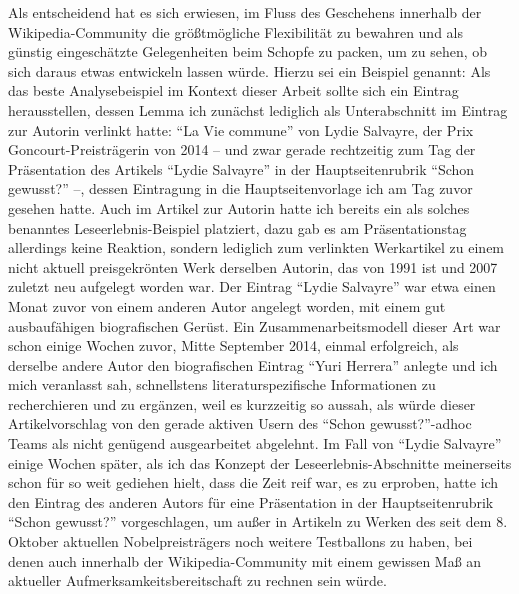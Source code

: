 \documentclass[fontsize=12pt]{scrartcl}
\begin{document}
Als entscheidend hat es sich erwiesen, im Fluss des Geschehens innerhalb der Wikipedia-Community die gr\"o{\ss}tm\"ogliche Flexibilit\"at zu bewahren und als g\"unstig einge\-sch\"atzte Gelegenheiten beim Schopfe zu packen, um zu sehen, ob sich daraus etwas entwickeln lassen w\"urde. Hierzu sei ein Beispiel genannt: Als das beste Ana\-lysebeispiel im Kontext dieser Arbeit sollte sich ein Eintrag he\-rausstellen, dessen Lemma ich zun\"achst lediglich als Unterabschnitt im Eintrag zur Autorin\textsuperscript{\tiny *} verlinkt hatte: "`La Vie commune"' von Lydie Salvayre, der Prix Goncourt-Preistr\"agerin\textsuperscript{\tiny *} von 2014 -- und zwar gerade rechtzeitig zum Tag der Pr\"asentation des Artikels "`Lydie Salvayre"' in der Hauptseitenrubrik "`Schon gewusst?"' --, dessen Eintragung in die Hauptseitenvorlage ich am Tag zuvor gesehen hatte. Auch im Artikel zur Autorin\textsuperscript{\tiny *} hatte ich bereits ein als solches benanntes Leseerlebnis-Beispiel platziert, dazu gab es am Pr\"asentationstag al\-ler\-dings keine Reaktion, sondern lediglich zum verlinkten Werkartikel zu einem nicht aktuell preisgekr\"onten Werk derselben Autorin\textsuperscript{\tiny *}, das von 1991 ist und 2007 zu\-letzt neu aufgelegt worden war. Der Eintrag "`Lydie Salvayre"' war etwa einen Monat zuvor von einem anderen Autor\textsuperscript{\tiny *} angelegt worden, mit einem gut ausbauf\"ahigen biografischen Ger\"ust. Ein Zusammenarbeits\-modell dieser Art war schon einige Wochen zuvor, Mitte September 2014, einmal erfolgreich, als derselbe andere Autor\textsuperscript{\tiny *} den biografischen Eintrag "`Yuri Herrera"' anlegte und ich mich veranlasst sah, schnellstens li\-te\-ra\-tur\-spezifische Informationen zu recherchieren und zu erg\"anzen, weil es kurzzeitig so aussah, als w\"urde dieser Artikelvorschlag von den gerade aktiven Usern des "`Schon gewusst?"'-adhoc Teams als nicht gen\"ugend ausgearbeitet abgelehnt. Im Fall von "`Lydie Salvayre"' einige Wochen sp\"ater, als ich das Konzept der Leseerlebnis-Abschnitte meinerseits schon f\"ur so weit gediehen hielt, dass die Zeit reif war, es zu erproben, hatte ich den Eintrag des anderen Autors\textsuperscript{\tiny *} f\"ur eine Pr\"asentation in der Hauptseitenrubrik "`Schon gewusst?"' vorgeschlagen, um au{\ss}er in Artikeln zu Werken des seit dem 8. Oktober aktuellen Nobelpreistr\"agers\textsuperscript{\tiny *} noch weitere Testballons zu haben, bei denen auch innerhalb der Wi\-ki\-pe\-dia-Community mit einem gewissen Ma{\ss} an aktueller Aufmerksamkeitsbereitschaft zu rechnen sein w\"urde.
\end{document}
